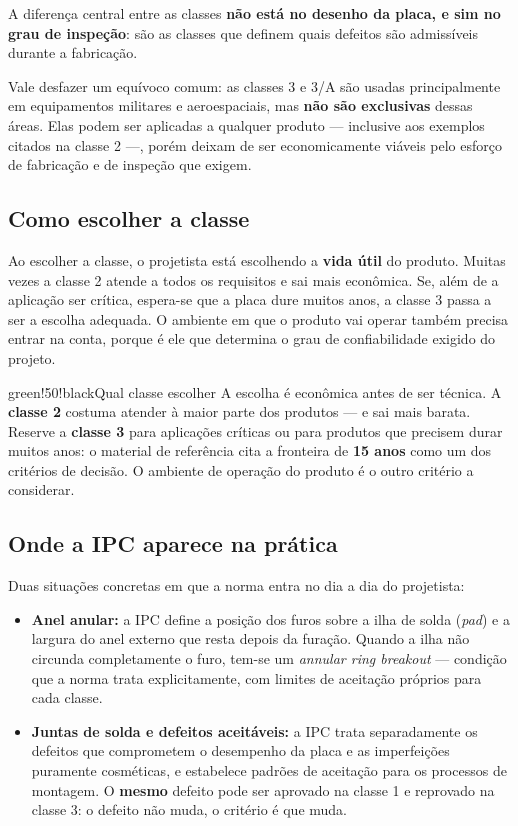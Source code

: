 A diferença central entre as classes \textbf{não está no desenho da placa, e sim no grau de inspeção}: são as classes que definem quais defeitos são admissíveis durante a fabricação.

Vale desfazer um equívoco comum: as classes 3 e 3/A são usadas principalmente em equipamentos militares e aeroespaciais, mas \textbf{não são exclusivas} dessas áreas. Elas podem ser aplicadas a qualquer produto --- inclusive aos exemplos citados na classe 2 ---, porém deixam de ser economicamente viáveis pelo esforço de fabricação e de inspeção que exigem.

\hypertarget{como-escolher-a-classe}{%
\subsection{Como escolher a classe}\label{como-escolher-a-classe}}

Ao escolher a classe, o projetista está escolhendo a \textbf{vida útil} do produto. Muitas vezes a classe 2 atende a todos os requisitos e sai mais econômica. Se, além de a aplicação ser crítica, espera-se que a placa dure muitos anos, a classe 3 passa a ser a escolha adequada. O ambiente em que o produto vai operar também precisa entrar na conta, porque é ele que determina o grau de confiabilidade exigido do projeto.

\begin{quadro}{green!50!black}{Qual classe escolher}
A escolha é econômica antes de ser técnica. A \textbf{classe 2} costuma
atender à maior parte dos produtos --- e sai mais barata. Reserve a
\textbf{classe 3} para aplicações críticas ou para produtos que precisem
durar muitos anos: o material de referência cita a fronteira de
\textbf{15 anos} como um dos critérios de decisão. O ambiente de
operação do produto é o outro critério a considerar.
\end{quadro}

\hypertarget{onde-a-ipc-aparece-na-pruxe1tica}{%
\subsection{Onde a IPC aparece na prática}\label{onde-a-ipc-aparece-na-pruxe1tica}}

Duas situações concretas em que a norma entra no dia a dia do projetista:

\begin{itemize}
\tightlist
\item
  \textbf{Anel anular:} a IPC define a posição dos furos sobre a ilha de solda (\emph{pad}) e
  a largura do anel externo que resta depois da furação. Quando a ilha não circunda completamente o furo, tem-se um \emph{annular ring breakout} --- condição que a norma trata explicitamente, com limites de aceitação próprios para cada classe.
\item
  \textbf{Juntas de solda e defeitos aceitáveis:} a IPC trata separadamente os defeitos
  que comprometem o desempenho da placa e as imperfeições puramente cosméticas, e estabelece padrões de aceitação para os processos de montagem. O \textbf{mesmo} defeito pode ser aprovado na classe 1 e reprovado na classe 3: o defeito não muda, o critério é que muda.
\end{itemize}

